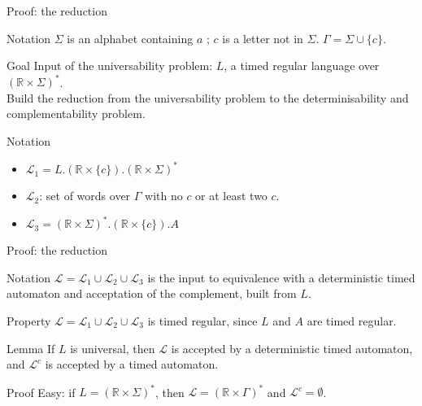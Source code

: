 \begin{frame}{Proof: the reduction}

	\begin{block}{Notation}
	    $\Sigma$ is an alphabet containing $a$ ; $c$ is a letter not in $\Sigma$. $\Gamma = \Sigma \cup \{c\}$.
  	\end{block}

	\begin{block}{Goal}
		Input of the universability problem: $L$, a timed regular language over $(\mathbb{R}\times\Sigma)^*$.\\
		Build the reduction from the universability problem to the determinisability and complementability problem.\\
  	\end{block}

	\begin{block}{Notation}
		\begin{itemize}
			\item $\mathcal{L}_1 = L.(\mathbb{R} \times \{c\}).(\mathbb{R}\times\Sigma)^*$
			\item $\mathcal{L}_2$: set of words over $\Gamma$ with no $c$ or at least two $c$.
			\item $\mathcal{L}_3 = (\mathbb{R}\times\Sigma)^*.(\mathbb{R} \times \{c\}).A$
		\end{itemize}
  	\end{block}

\end{frame}


\begin{frame}{Proof: the reduction}

	\begin{block}{Notation}
		$\mathcal{L} = \mathcal{L}_1 \cup \mathcal{L}_2 \cup \mathcal{L}_3$ is the input to equivalence with a deterministic timed automaton and acceptation of the complement, built from $L$.
	\end{block}

	\begin{block}{Property}
		$\mathcal{L} = \mathcal{L}_1 \cup \mathcal{L}_2 \cup \mathcal{L}_3$ is timed regular, since $L$ and $A$ are timed regular.
	\end{block}

	\begin{block}{Lemma}
		If $L$ is universal, then $\mathcal{L}$ is accepted by a deterministic timed automaton, and $\mathcal{L}^c$ is accepted by a timed automaton.
	\end{block}

	\begin{block}{Proof}
		Easy: if $L = (\mathbb{R}\times\Sigma)^*$, then $\mathcal{L} = (\mathbb{R}\times\Gamma)^*$ and $\mathcal{L}^c = \emptyset$.
	\end{block}

	
\end{frame}


